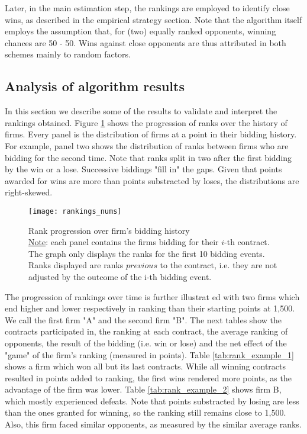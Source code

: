 Later, in the main estimation step, the rankings are employed to identify close wins, as described in the empirical strategy section. Note that the algorithm itself employs the assumption that, for (two) equally ranked opponents, winning chances are 50 - 50. Wins against close opponents are thus attributed in both schemes mainly to random factors.

\subsection{Analysis of algorithm results}
In this section we describe some of the results to validate and interpret the rankings obtained. Figure \ref{fig:rankings_nums} shows the progression of ranks over the history of firms. Every panel is the distribution of firms at a point in their bidding history. For example, panel two shows the distribution of ranks between firms who are bidding for the second time. Note that ranks split in two after the first bidding by the win or a lose. Successive biddings "fill in" the gaps. Given that points awarded for wins are more than points substracted by loses, the distributions are right-skewed.

\begin{figure}[H]
\centering
  \texttt{[image: rankings\_nums]}
  \caption{Rank progression over firm's bidding history \\ \footnotesize \underline{Note}: each panel contains the firms bidding for their $i$-th contract. The graph only displays the ranks for the first 10 bidding events. Ranks displayed are ranks $previous$ to the contract, i.e. they are not adjusted by the outcome of the i-th bidding event.}
  \label{fig:rankings_nums}
\end{figure}

The progression of rankings over time is further illustrat ed with two firms which end higher and lower respectively in ranking than their starting points at 1,500. We call the first firm "A" and the second firm "B".  The next tables show the contracts participated in, the ranking at each contract, the average ranking of opponents, the result of the bidding (i.e. win or lose) and the net effect of the "game" of the firm's ranking (measured in points). Table \ref{tab:rank_example_1} shows a firm which won all but its last contracts. While all winning contracts resulted in points added to ranking, the first wins rendered more points, as the advantage of the firm was lower. Table \ref{tab:rank_example_2} shows firm B, which mostly experienced defeats. Note that points substracted by losing are less than the ones granted for winning, so the ranking still remains close to 1,500. Also, this firm faced similar opponents, as measured by the similar average ranks.




